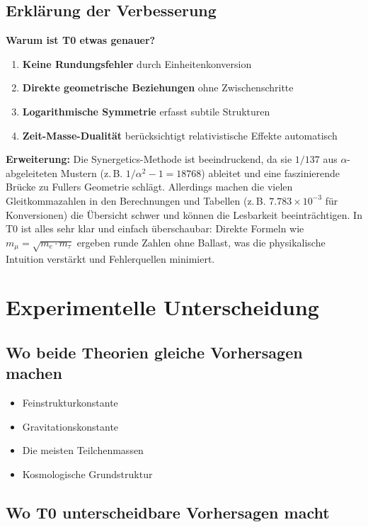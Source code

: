 \documentclass[12pt,a4paper]{article}
\begin{document}
	\subsection{Erklärung der Verbesserung}
	
	\textbf{Warum ist T0 etwas genauer?}
	
	\begin{enumerate}
		\item \textbf{Keine Rundungsfehler} durch Einheitenkonversion
		\item \textbf{Direkte geometrische Beziehungen} ohne Zwischenschritte
		\item \textbf{Logarithmische Symmetrie} erfasst subtile Strukturen
		\item \textbf{Zeit-Masse-Dualität} berücksichtigt relativistische Effekte automatisch
	\end{enumerate}
	
	\textbf{Erweiterung:} Die Synergetics-Methode ist beeindruckend, da sie $1/137$ aus $\alpha$-abgeleiteten Mustern (z.\,B. $1/\alpha^2 - 1 = 18768$) ableitet und eine faszinierende Brücke zu Fullers Geometrie schlägt. Allerdings machen die vielen Gleitkommazahlen in den Berechnungen und Tabellen (z.\,B. $7.783 \times 10^{-3}$ für Konversionen) die Übersicht schwer und können die Lesbarkeit beeinträchtigen. In T0 ist alles sehr klar und einfach überschaubar: Direkte Formeln wie $m_\mu = \sqrt{m_e \cdot m_\tau}$ ergeben runde Zahlen ohne Ballast, was die physikalische Intuition verstärkt und Fehlerquellen minimiert.
	
	\section{Experimentelle Unterscheidung}
	
	\subsection{Wo beide Theorien gleiche Vorhersagen machen}
	
	\begin{itemize}
		\item Feinstrukturkonstante
		\item Gravitationskonstante
		\item Die meisten Teilchenmassen
		\item Kosmologische Grundstruktur
	\end{itemize}
	
	\subsection{Wo T0 unterscheidbare Vorhersagen macht}
	
\end{document}
